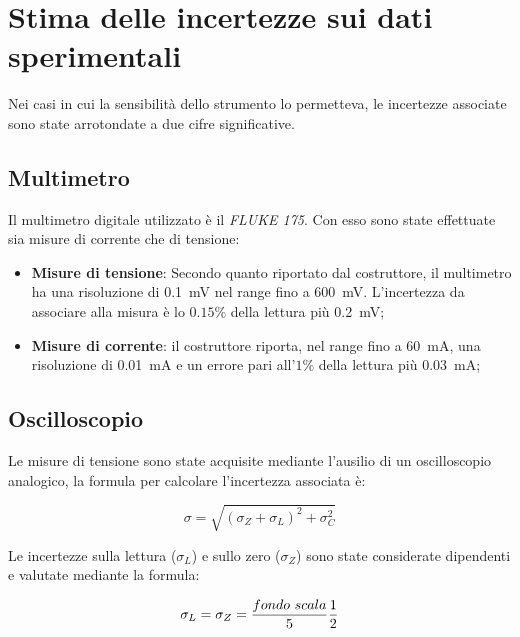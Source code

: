 \documentclass[@SRC@/main]{subfiles}
\begin{document}
    \section{Stima delle incertezze sui dati sperimentali}
    \label{sec:stima-delle-incertezze-sui-dati-sperimentali}
    Nei casi in cui la sensibilità dello strumento lo permetteva, le incertezze associate sono
    state arrotondate a due cifre significative.
    \subsection*{Multimetro}
    Il multimetro digitale utilizzato è il \textit{FLUKE 175}.
    Con esso sono state effettuate sia misure di corrente che di tensione:
    \begin{itemize}
        \item \textbf{Misure di tensione}: Secondo quanto riportato dal costruttore, il multimetro
        ha una risoluzione di 0.1~mV nel range fino a 600~mV. L'incertezza da associare alla misura
        è lo $0.15\%$ della lettura più 0.2~mV;
        \item \textbf{Misure di corrente}: il costruttore riporta, nel range fino a
        60~mA, una risoluzione di 0.01~mA e un errore pari all'$1\%$ della
        lettura più 0.03~mA;
    \end{itemize}

    \subsection*{Oscilloscopio}
    \noindent Le misure di tensione sono state acquisite mediante l'ausilio di un oscilloscopio analogico,
    la formula per calcolare l'incertezza associata è:
    
        \begin{equation*}
            \sigma = \sqrt {\left( \sigma_Z + \sigma_L  \right)^2 + \sigma_C^2}
        \end{equation*}
    
\vspace{0.1cm}
    \noindent Le incertezze sulla lettura ($\sigma_L$) e sullo zero ($\sigma_Z$) sono state considerate dipendenti
    e valutate mediante la formula:
    \vspace{0.1cm}


        \begin{equation*}
            \sigma_L = \sigma_Z = \frac{fondo\textnormal{ }scala}{5} \frac{1}{2}
        \end{equation*}
\end{document}
